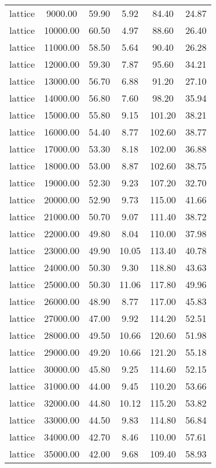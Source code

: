\begin{table}[ht]
\begin{table}[ht]
\begin{tabular}{|cccccc}
  lattice & 9000.00 & 59.90 & 5.92 & 84.40 & 24.87 \\ 
  lattice & 10000.00 & 60.50 & 4.97 & 88.60 & 26.40 \\ 
  lattice & 11000.00 & 58.50 & 5.64 & 90.40 & 26.28 \\ 
  lattice & 12000.00 & 59.30 & 7.87 & 95.60 & 34.21 \\ 
  lattice & 13000.00 & 56.70 & 6.88 & 91.20 & 27.10 \\ 
  lattice & 14000.00 & 56.80 & 7.60 & 98.20 & 35.94 \\ 
  lattice & 15000.00 & 55.80 & 9.15 & 101.20 & 38.21 \\ 
  lattice & 16000.00 & 54.40 & 8.77 & 102.60 & 38.77 \\ 
  lattice & 17000.00 & 53.30 & 8.18 & 102.00 & 36.88 \\ 
  lattice & 18000.00 & 53.00 & 8.87 & 102.60 & 38.75 \\ 
  lattice & 19000.00 & 52.30 & 9.23 & 107.20 & 32.70 \\ 
  lattice & 20000.00 & 52.90 & 9.73 & 115.00 & 41.66 \\ 
  lattice & 21000.00 & 50.70 & 9.07 & 111.40 & 38.72 \\ 
  lattice & 22000.00 & 49.80 & 8.04 & 110.00 & 37.98 \\ 
  lattice & 23000.00 & 49.90 & 10.05 & 113.40 & 40.78 \\ 
  lattice & 24000.00 & 50.30 & 9.30 & 118.80 & 43.63 \\ 
  lattice & 25000.00 & 50.30 & 11.06 & 117.80 & 49.96 \\ 
  lattice & 26000.00 & 48.90 & 8.77 & 117.00 & 45.83 \\ 
  lattice & 27000.00 & 47.00 & 9.92 & 114.20 & 52.51 \\ 
  lattice & 28000.00 & 49.50 & 10.66 & 120.60 & 51.98 \\ 
  lattice & 29000.00 & 49.20 & 10.66 & 121.20 & 55.18 \\ 
  lattice & 30000.00 & 45.80 & 9.25 & 114.60 & 52.15 \\ 
  lattice & 31000.00 & 44.00 & 9.45 & 110.20 & 53.66 \\ 
  lattice & 32000.00 & 44.80 & 10.12 & 115.20 & 53.82 \\ 
  lattice & 33000.00 & 44.50 & 9.83 & 114.80 & 56.84 \\ 
  lattice & 34000.00 & 42.70 & 8.46 & 110.00 & 57.61 \\ 
  lattice & 35000.00 & 42.00 & 9.68 & 109.40 & 58.93 \\ 

\end{tabular}
\end{table}
\end{table}
